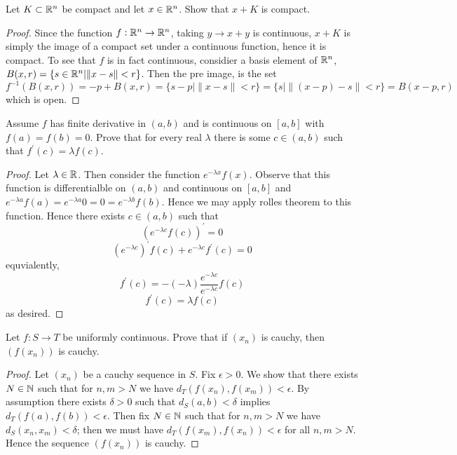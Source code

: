 \question
Let $K \subset \mathbb{R}^n$ be compact and let $x \in \mathbb{R}^n$. Show that $x + K$ is compact. 

\begin{proof}
	Since the function $f:\mathbb{R}^n \to \mathbb{R}^n$, taking $y \to x + y$ is continuous, $x+ K$ is simply the image 
of a compact set under a continuous function, hence it is compact. To see that $f$ is in fact continuous, considier 
	a basis element of $\mathbb{R}^n$, $B(x, r) = \{s \in \mathbb{R}^n | \|x - s\| < r\}$. Then the pre image, is the set 
	$f^{-1}(B(x,r)) = -p + B(x, r) = \{s - p | \|x - s\| < r\} = \{s | \|(x - p)-s\| < r\} = B(x - p, r) $ which is open.  
\end{proof}

\question
Assume $f$ has finite derivative in $(a, b)$ and is continuous on $[a, b]$ with $f(a) = f(b) = 0$. Prove that for every real $\lambda$ there is some $c \in (a, b)$ such that $f^\prime(c) = \lambda f(c)$. 

\begin{proof}
Let $\lambda \in \mathbb{R}$. Then consider the function $e^{-\lambda x}f(x)$. Observe that this function is differentialble on $(a, b)$ and continuous on $[a, b]$ and $e^{-\lambda a}f(a) = e^{-\lambda a} 0 = 0 = e^{-\lambda b}f(b)$. Hence we may apply rolles theorem to this function. Hence there exists $c \in (a, b)$ such that 
	\[(e^{-\lambda c} f(c))^\prime = 0\] 
	\[(e^{-\lambda c})^\prime f(c) + e^{-\lambda c} f^\prime(c) = 0\] 
equvialently, 
	\[f^\prime(c) =-(-\lambda) \frac{e^{-\lambda c}}{e^{-\lambda c}} f(c) \] 
	\[ f^\prime(c) = \lambda f(c) \] 
as desired. 
\end{proof}
\question
Let $f: S \to T$ be uniformly continuous. Prove that if $(x_n)$ is cauchy, then $(f(x_n))$ is cauchy. 

\begin{proof}
Let $(x_n)$ be a cauchy sequence in $S$. Fix $\epsilon > 0$. We show that there exists $N \in  \mathbb{N}$ such that for $n,m > N$ we have $d_T(f(x_n), f(x_m)) < \epsilon$. 
	By assumption there exists $\delta > 0$ such that $d_S(a, b) < \delta$ implies $d_T(f(a), f(b)) < \epsilon$. Then fix $N \in \mathbb{N}$ such that for $n,m > N$ we have 
	$d_S(x_n, x_m) < \delta$; then we must have $d_T(f(x_m), f(x_n)) < \epsilon$ for all $n, m > N$. Hence the sequence $(f(x_n))$ is cauchy. 
\end{proof}


